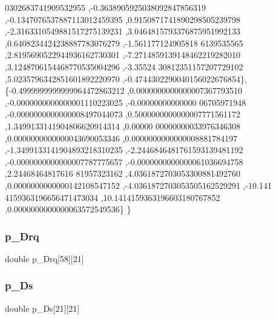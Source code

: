 \begin{DoxyCode}
      0302683741909532955 ,-0.3638905925038092847856319 ,-0.1347076537887113012459395 ,0.9150871741890298505239798
       ,-2.3163310549881517275139231 ,3.0464815793376875951992133 ,0.6408234424238887783076279 ,-1.561177124905818
      6139535565 ,2.8195690522944936162730301 ,-7.2714859139148462219282010 ,3.1248706154468770535004296 ,-3.35524
      30812351157207729102 ,5.0235796342851601892220970 ,-0.4744302290040156022676854\},
\{-0.4999999999999964472863212 ,0.0000000000000007367793510 ,-0.0000000000000001110223025 ,-0.00000000000000
      06705971948 ,-0.0000000000000008497044073 ,0.5000000000000007771561172 ,1.3499133141904806620914314 ,0.00000
      00000000033976346308 ,0.0000000000000043690053346 ,0.0000000000000008881784197 ,-1.3499133141904893218310235
       ,-2.2446846481761593139481192 ,-0.0000000000000007787775657 ,-0.0000000000000061036694758 ,2.24468464817616
      81957323162 ,4.0361872703053300881492760 ,0.0000000000000142108547152 ,-4.0361872703053505162529291 ,-10.141
      4159363196656471473034 ,10.1414159363196603180767852 ,0.0000000000000063572549536\}
\}
\end{DoxyCode}
\mbox{\label{a00458_a82c15fa1b38623b45832ac6520671f20}} 
\subsubsection{\texorpdfstring{p\+\_\+\+Drq}{p\_Drq}}
{\footnotesize\ttfamily double p\+\_\+\+Drq\mbox{[}58\mbox{]}\mbox{[}21\mbox{]}}

\mbox{\label{a00458_ae5879986c23478332a7ea6d4ec0bd535}} 
\subsubsection{\texorpdfstring{p\+\_\+\+Ds}{p\_Ds}}
{\footnotesize\ttfamily double p\+\_\+\+Ds\mbox{[}21\mbox{]}\mbox{[}21\mbox{]}}

